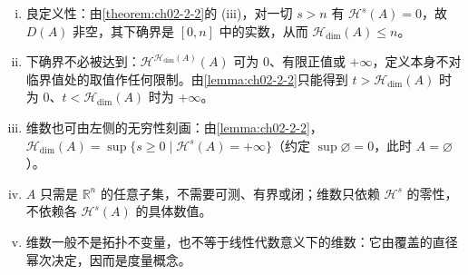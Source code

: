 \documentclass[../../main.tex]{subfiles}%
\begin{document}
\begin{remark}\label{remark:ch02-def-2-2-条件}
\begin{enumerate}[(i)]
\item 良定义性：由\cref{theorem:ch02-2-2}的 (iii)，对一切 $s>n$ 有 $\mathcal{H}^s(A)=0$，故 $D(A)$ 非空，其下确界是 $[0,n]$ 中的实数，从而 $\mathcal{H}_{\dim}(A)\leqslant n$。%
\item 下确界不必被达到：$\mathcal{H}^{\mathcal{H}_{\dim}(A)}(A)$ 可为 $0$、有限正值或 $+\infty$，定义本身不对临界值处的取值作任何限制。由\cref{lemma:ch02-2-2}只能得到 $t>\mathcal{H}_{\dim}(A)$ 时为 $0$、$t<\mathcal{H}_{\dim}(A)$ 时为 $+\infty$。%
\item 维数也可由左侧的无穷性刻画：由\cref{lemma:ch02-2-2}，$\mathcal{H}_{\dim}(A)=\sup\{s\geqslant0\mid\mathcal{H}^s(A)=+\infty\}$（约定 $\sup\varnothing=0$，此时 $A=\varnothing$）。%
\item $A$ 只需是 $\mathbb{R}^n$ 的任意子集，不需要可测、有界或闭；维数只依赖 $\mathcal{H}^s$ 的零性，不依赖各 $\mathcal{H}^s(A)$ 的具体数值。
\item 维数一般不是拓扑不变量，也不等于线性代数意义下的维数：它由覆盖的直径幂次决定，因而是度量概念。
\end{enumerate}
\end{remark}
\end{document}
